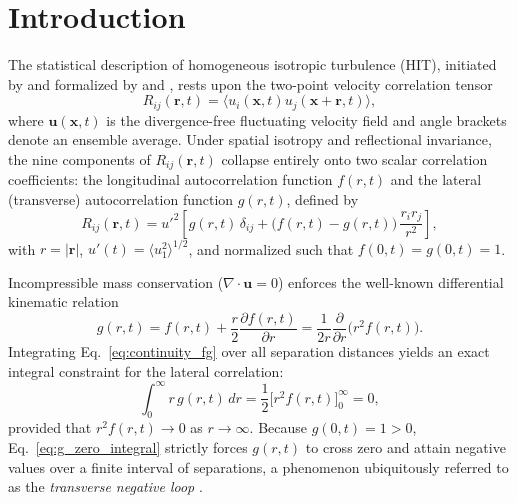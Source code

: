 \documentclass[lineno]{jfm}
\begin{document}
\section{Introduction}
\label{sec:intro}
The statistical description of homogeneous isotropic turbulence (HIT), initiated by \citet{Taylor1935} and formalized by \citet{vonKarmanHowarth1938} and \citet{Robertson1940}, rests upon the two-point velocity correlation tensor
\begin{equation}
R_{ij}(\mathbf{r}, t) = \langle u_i(\mathbf{x}, t) u_j(\mathbf{x} + \mathbf{r}, t) \rangle,
\label{eq:Rij_def}
\end{equation}
where $\mathbf{u}(\mathbf{x}, t)$ is the divergence-free fluctuating velocity field and angle brackets denote an ensemble average. Under spatial isotropy and reflectional invariance, the nine components of $R_{ij}(\mathbf{r}, t)$ collapse entirely onto two scalar correlation coefficients: the longitudinal autocorrelation function $f(r, t)$ and the lateral (transverse) autocorrelation function $g(r, t)$, defined by
\begin{equation}
R_{ij}(\mathbf{r}, t) = u'^2 \left[ g(r, t)\,\delta_{ij} + \big(f(r, t) - g(r, t)\big)\,\frac{r_i r_j}{r^2} \right],
\label{eq:Rij_isotropic}
\end{equation}
with $r = |\mathbf{r}|$, $u'(t) = \langle u_1^2 \rangle^{1/2}$, and normalized such that $f(0, t) = g(0, t) = 1$.

Incompressible mass conservation ($\nabla \cdot \mathbf{u} = 0$) enforces the well-known differential kinematic relation
\begin{equation}
g(r, t) = f(r, t) + \frac{r}{2} \frac{\partial f(r, t)}{\partial r} = \frac{1}{2r} \frac{\partial}{\partial r}\big(r^2 f(r, t)\big).
\label{eq:continuity_fg}
\end{equation}
Integrating Eq.~\eqref{eq:continuity_fg} over all separation distances yields an exact integral constraint for the lateral correlation:
\begin{equation}
\int_0^\infty r\,g(r, t)\,dr = \frac{1}{2} \Big[ r^2 f(r, t) \Big]_0^\infty = 0,
\label{eq:g_zero_integral}
\end{equation}
provided that $r^2 f(r, t) \to 0$ as $r \to \infty$. Because $g(0, t) = 1 > 0$, Eq.~\eqref{eq:g_zero_integral} strictly forces $g(r, t)$ to cross zero and attain negative values over a finite interval of separations, a phenomenon ubiquitously referred to as the \emph{transverse negative loop} \citep{Batchelor1953, MoninYaglom1975, Pope2000, Davidson2004}.
\end{document}
